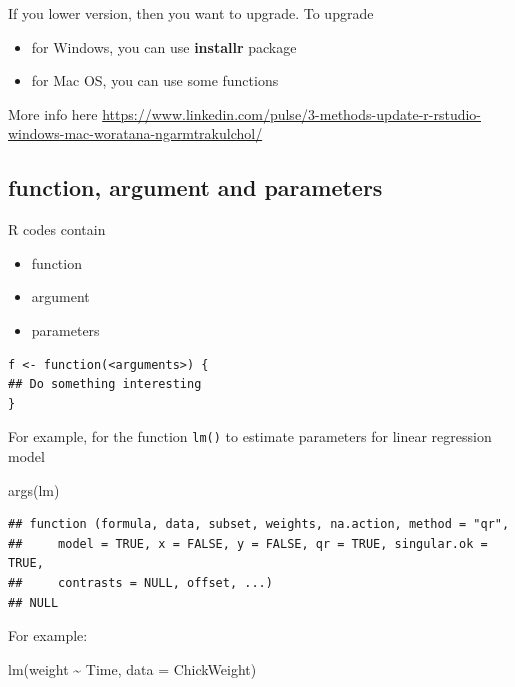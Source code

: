 \documentclass[
]{book}
\makeatletter
\newenvironment{Shaded}{\begin{snugshade}}{\end{snugshade}}
\newcommand{\AttributeTok}[1]{\textcolor[rgb]{0.61,0.61,0.61}{#1}}
\newcommand{\FunctionTok}[1]{\textcolor[rgb]{0,0,0}{#1}}
\newcommand{\NormalTok}[1]{#1}
\newcommand{\SpecialCharTok}[1]{\textcolor[rgb]{0,0,0}{#1}}
\providecommand{\tightlist}{%
  \setlength{\itemsep}{0pt}\setlength{\parskip}{0pt}}
\newenvironment{kframe}{%
\medskip{}
\setlength{\fboxsep}{.8em}
 \def\at@end@of@kframe{}%
 \ifinner\ifhmode%
  \def\at@end@of@kframe{\end{minipage}}%
  \begin{minipage}{\columnwidth}%
 \fi\fi%
 \def\FrameCommand##1{\hskip\@totalleftmargin \hskip-\fboxsep
 \colorbox{shadecolor}{##1}\hskip-\fboxsep
     \hskip-\linewidth \hskip-\@totalleftmargin \hskip\columnwidth}%
 \MakeFramed {\advance\hsize-\width
   \@totalleftmargin\z@ \linewidth\hsize
   \@setminipage}}%
 {\par\unskip\endMakeFramed%
 \at@end@of@kframe}
\renewenvironment{Shaded}{\begin{kframe}}{\end{kframe}}
\makeatother
\begin{document}
If you lower version, then you want to upgrade. To upgrade

\begin{itemize}
\tightlist
\item
  for Windows, you can use \textbf{installr} package
\item
  for Mac OS, you can use some functions
\end{itemize}

More info here \url{https://www.linkedin.com/pulse/3-methods-update-r-rstudio-windows-mac-woratana-ngarmtrakulchol/}

\hypertarget{function-argument-and-parameters}{%
\subsection{function, argument and parameters}\label{function-argument-and-parameters}}

R codes contain

\begin{itemize}
\tightlist
\item
  function
\item
  argument
\item
  parameters
\end{itemize}

\begin{verbatim}
f <- function(<arguments>) {
## Do something interesting
}
\end{verbatim}

For example, for the function \texttt{lm()} to estimate parameters for linear regression model

\begin{Shaded}
\begin{Highlighting}[]
\FunctionTok{args}\NormalTok{(lm)}
\end{Highlighting}
\end{Shaded}

\begin{verbatim}
## function (formula, data, subset, weights, na.action, method = "qr", 
##     model = TRUE, x = FALSE, y = FALSE, qr = TRUE, singular.ok = TRUE, 
##     contrasts = NULL, offset, ...) 
## NULL
\end{verbatim}

For example:

\begin{Shaded}
\begin{Highlighting}[]
\FunctionTok{lm}\NormalTok{(weight }\SpecialCharTok{\textasciitilde{}}\NormalTok{ Time, }\AttributeTok{data =}\NormalTok{ ChickWeight)}
\end{Highlighting}
\end{Shaded}
\end{document}
